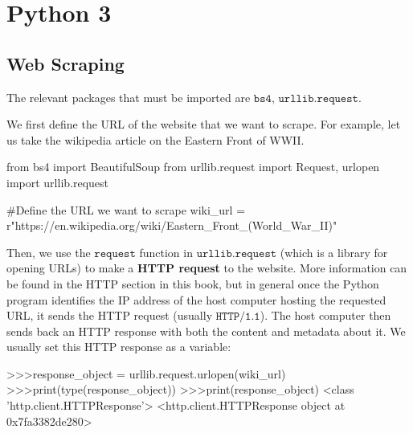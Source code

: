 \documentclass[a4paper, 12pt]{report}
\theoremstyle{remark}
\theoremstyle{definition}
\begin{document}
\chapter{Python 3}
\section{Web Scraping}
The relevant packages that must be imported are $\texttt{bs4, urllib.request}$. 

We first define the URL of the website that we want to scrape. For example, let us take the wikipedia article on the Eastern Front of WWII. 
\begin{python}
from bs4 import BeautifulSoup
from urllib.request import Request, urlopen
import urllib.request

#Define the URL we want to scrape
wiki_url = r"https://en.wikipedia.org/wiki/Eastern_Front_(World_War_II)"
\end{python}
Then, we use the $\texttt{request}$ function in $\texttt{urllib.request}$ (which is a library for opening URLs) to make a \textbf{HTTP request} to the website. More information can be found in the HTTP section in this book, but in general once the Python program identifies the IP address of the host computer hosting the requested URL, it sends the HTTP request (usually $\texttt{HTTP/1.1}$). The host computer then sends back an HTTP response with both the content and metadata about it. We usually set this HTTP response as a variable: 
\begin{python}
>>>response_object = urllib.request.urlopen(wiki_url)
>>>print(type(response_object)) 
>>>print(response_object)
<class 'http.client.HTTPResponse'>
<http.client.HTTPResponse object at 0x7fa3382de280>
\end{python}
\end{document}
